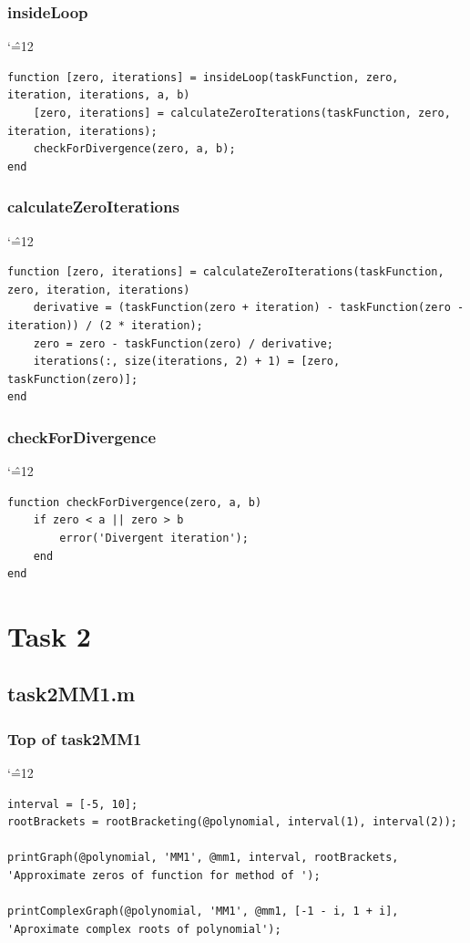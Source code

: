 \documentclass[12pt]{report}
\newenvironment{simplechar}{%
   \catcode`\^=12
}{}
\begin{document}
\subsubsection{insideLoop}
\begin{simplechar}
\begin{lstlisting}
function [zero, iterations] = insideLoop(taskFunction, zero, iteration, iterations, a, b)
    [zero, iterations] = calculateZeroIterations(taskFunction, zero, iteration, iterations);
    checkForDivergence(zero, a, b);
end
\end{lstlisting}
\end{simplechar}

\subsubsection{calculateZeroIterations}
\begin{simplechar}
\begin{lstlisting}
function [zero, iterations] = calculateZeroIterations(taskFunction, zero, iteration, iterations)
    derivative = (taskFunction(zero + iteration) - taskFunction(zero - iteration)) / (2 * iteration);
    zero = zero - taskFunction(zero) / derivative;
    iterations(:, size(iterations, 2) + 1) = [zero, taskFunction(zero)];
end
\end{lstlisting}
\end{simplechar}

\subsubsection{checkForDivergence}
\begin{simplechar}
\begin{lstlisting}
function checkForDivergence(zero, a, b)
    if zero < a || zero > b
        error('Divergent iteration');
    end
end
\end{lstlisting}
\end{simplechar}

\newpage
\section{Task 2}

\subsection{task2MM1.m}

\subsubsection{Top of task2MM1}
\begin{simplechar}
\begin{lstlisting}
interval = [-5, 10];
rootBrackets = rootBracketing(@polynomial, interval(1), interval(2));

printGraph(@polynomial, 'MM1', @mm1, interval, rootBrackets, 'Approximate zeros of function for method of ');

printComplexGraph(@polynomial, 'MM1', @mm1, [-1 - i, 1 + i], 'Aproximate complex roots of polynomial');
\end{lstlisting}
\end{simplechar}
\end{document}
